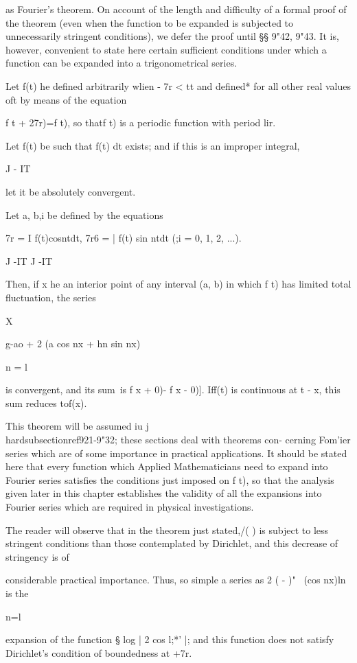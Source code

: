as Fourier's theorem. On account of the length and difficulty of a
formal proof of the theorem (even when the function to be expanded is
subjected to unnecessarily stringent conditions), we defer the proof
until §§ 9"42, 9"43. It is, however, convenient to state here certain
sufficient conditions under which a function can be expanded into a
trigonometrical series.

Let f(t) he defined arbitrarily wlien - 7r < tt and defined* for all
other real values oft by means of the equation

f t + 27r)=f t), so thatf t) is a periodic function with period lir.

Let f(t) be such that f(t) dt exists; and if this is an improper
integral,

J - IT

let it be absolutely convergent.

Let a, b,i be defined by the equations

7r = I f(t)cosntdt, 7r6 = | f(t) sin ntdt (;i = 0, 1, 2, ...).

J -IT J -IT

Then, if x he an interior point of any interval (a, b) in which f t)
has limited total fluctuation, the series

X

 g-ao + 2 (a cos nx + hn sin nx)

n = l

is convergent, and its sum\ is f x + 0)- f x - 0)]. Iff(t) is
continuous at t - x, this sum reduces tof(x).

This theorem will be assumed iu j\\hardsubsectionref{9}{2}{1}-9"32; these sections deal
with theorems con- cerning Fom'ier series which are of some importance
in practical applications. It should be stated here that every
function which Applied Mathematicians need to expand into Fourier
series satisfies the conditions just imposed on f t), so that the
analysis given later in this chapter establishes the validity of all
the expansions into Fourier series which are required in physical
investigations.

The reader will observe that in the theorem just stated,/( ) is
subject to less stringent conditions than those contemplated by
Dirichlet, and this decrease of stringency is of

considerable practical importance. Thus, so simple a series as 2 ( -
)"~ (cos nx)ln is the

n=l

expansion of the function § log | 2 cos l;*' |; and this function
does not satisfy Dirichlet's condition of boundedness at +7r.

